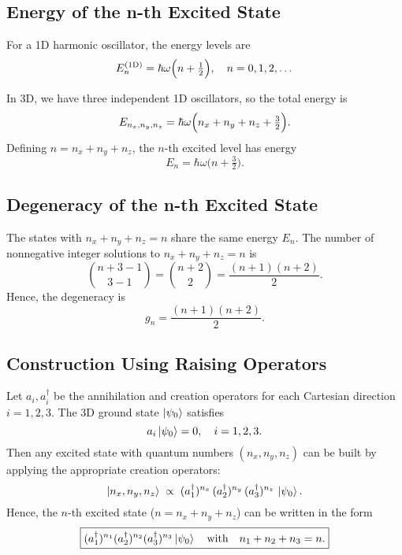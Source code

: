\documentclass[12pt]{article}
\begin{document}
\subsection*{Energy of the n-th Excited State}
For a 1D harmonic oscillator, the energy levels are
\begin{equation}
E_n^{(\text{1D})} = \hbar \omega \Bigl(n + \tfrac12\Bigr), \quad n = 0,1,2,\dots
\end{equation}

In 3D, we have three independent 1D oscillators, so the total energy is
\begin{equation}
E_{n_x,n_y,n_z} = \hbar\omega\Bigl(n_x + n_y + n_z + \tfrac32\Bigr).
\end{equation}
Defining \(n = n_x + n_y + n_z\), the \(n\)-th excited level has energy
\begin{equation}
\boxed{E_n = \hbar \omega \bigl(n + \tfrac{3}{2}\bigr).}
\end{equation}

\subsection*{Degeneracy of the n-th Excited State}
The states with \(n_x + n_y + n_z = n\) share the same energy \(E_n\). The number of nonnegative integer solutions to \(n_x + n_y + n_z = n\) is
\begin{equation}
\binom{n + 3 - 1}{3 - 1} = \binom{n + 2}{2} = \frac{(n+1)(n+2)}{2}.
\end{equation}
Hence, the degeneracy is
\begin{equation}
\boxed{g_n = \frac{(n+1)(n+2)}{2}.}
\end{equation}

\subsection*{Construction Using Raising Operators}
Let \(a_i, a_i^\dagger\) be the annihilation and creation operators for each Cartesian direction \(i = 1,2,3\). The 3D ground state \(\ket{\psi_0}\) satisfies
\begin{equation}
a_i \ket{\psi_0} = 0, \quad i = 1,2,3.
\end{equation}
Then any excited state with quantum numbers \((n_x, n_y, n_z)\) can be built by applying the appropriate creation operators:
\begin{equation}
\ket{n_x, n_y, n_z} \;\propto\; (a_1^\dagger)^{n_x}\,(a_2^\dagger)^{n_y}\,(a_3^\dagger)^{n_z}\,\ket{\psi_0}.
\end{equation}
Hence, the \(n\)-th excited state (\(n = n_x + n_y + n_z\)) can be written in the form
\begin{equation}
\boxed{(a_1^\dagger)^{n_1}(a_2^\dagger)^{n_2}(a_3^\dagger)^{n_3} \ket{\psi_0} \quad\text{with}\quad n_1 + n_2 + n_3 = n.}
\end{equation}
\end{document}
